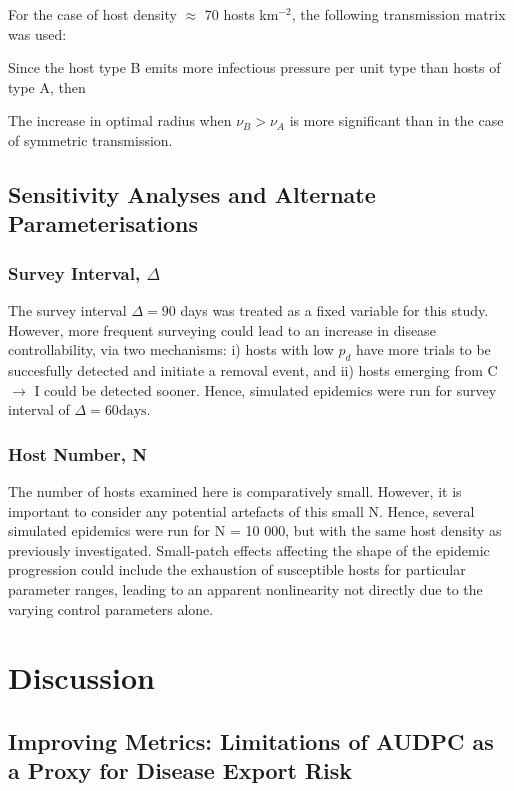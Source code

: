 \documentclass[prstpaper]{revtex4-2}
\begin{document}
For the case of host density $\approx$ 70 hosts km$^{-2}$, the following transmission matrix was used:  

% 
%



Since the host type B emits more infectious pressure per unit type than hosts of type A, then 


The increase in optimal radius when $\nu_{B} > \nu_{A}$ is more significant than in the case of symmetric transmission. 

\subsection{Sensitivity Analyses and Alternate Parameterisations}

\subsubsection{Survey Interval, $\Delta$}
The survey interval $\Delta = 90$ days was treated as a fixed variable for this study. However, more frequent surveying could lead to an increase in disease controllability, via two mechanisms: i) hosts with low $p_d$ have more trials to be succesfully detected and initiate a removal event, and ii) hosts emerging from C $\rightarrow$ I could be detected sooner. Hence, simulated epidemics were run for survey interval of $\Delta = 60 \mathrm{ days}$.

\subsubsection{Host Number, N}

The number of hosts examined here is comparatively small. However, it is important to consider any potential artefacts of this small N. Hence, several simulated epidemics were run for N = 10 000, but with the same host density as previously investigated. Small-patch effects affecting the shape of the epidemic progression could include the exhaustion of susceptible hosts for particular parameter ranges, leading to an apparent nonlinearity not directly due to the varying control parameters alone. 

\section*{Discussion}

\subsection{Improving Metrics: Limitations of AUDPC as a Proxy for Disease Export Risk}
\end{document}
